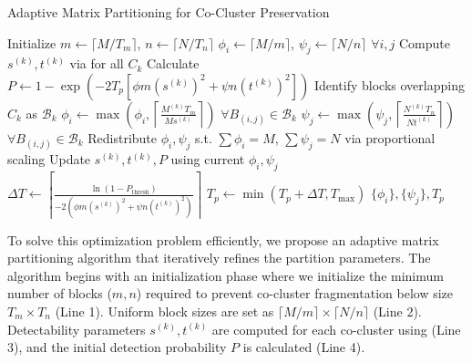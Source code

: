\documentclass[journal]{IEEEtran}
\begin{document}
\begin{algorithm}[!t]
    \caption{Adaptive Matrix Partitioning for Co-Cluster Preservation}
    \label{alg:partitioning}
    \begin{algorithmic}[1]
        \STATE Initialize $m \gets \lceil M / T_m \rceil$, $n \gets \lceil N / T_n \rceil$ 
        \STATE $\phi_i \gets \lceil M/m \rceil$, $\psi_j \gets \lceil N/n \rceil$ $\forall i,j$ 
        \STATE Compute $s^{(k)}, t^{(k)}$ via  for all $C_k$
        \STATE Calculate $P \gets 1 - \exp\left( -2 T_p \left[ \phi m (s^{(k)})^2 + \psi n (t^{(k)})^2 \right] \right)$
        \STATE Identify blocks overlapping $C_k$ as $\mathcal{B}_k$
        \STATE $\phi_i \gets \max\left( \phi_i, \left\lceil \frac{M^{(k)} T_m}{M s^{(k)}} \right\rceil \right)$ $\forall B_{(i,j)} \in \mathcal{B}_k$
        \STATE $\psi_j \gets \max\left( \psi_j, \left\lceil \frac{N^{(k)} T_n}{N t^{(k)}} \right\rceil \right)$ $\forall B_{(i,j)} \in \mathcal{B}_k$
        \ENDFOR
        \STATE Redistribute $\phi_i, \psi_j$ s.t. $\sum \phi_i = M$, $\sum \psi_j = N$ via proportional scaling
        \STATE Update $s^{(k)}, t^{(k)}, P$ using current $\phi_i, \psi_j$
        \STATE $\Delta T \gets \left\lceil \frac{\ln(1 - P_{\text{thresh}})}{-2 \left( \phi m (s^{(k)})^2 + \psi n (t^{(k)})^2 \right)} \right\rceil$
        \STATE $T_p \gets \min(T_p + \Delta T, T_{\text{max}})$
        \ENDIF
        \ENDWHILE
        \RETURN $\{\phi_i\}, \{\psi_j\}, T_p$
    \end{algorithmic}
\end{algorithm}

To solve this optimization problem efficiently, we propose an adaptive matrix partitioning algorithm that iteratively refines the partition parameters. The algorithm begins with an initialization phase where we initialize the minimum number of blocks ($m,n$) required to prevent co-cluster fragmentation below size $T_m \times T_n$ (Line 1). Uniform block sizes are set as $\lceil M/m \rceil \times \lceil N/n \rceil$ (Line 2). Detectability parameters $s^{(k)}, t^{(k)}$ are computed for each co-cluster using  (Line 3), and the initial detection probability $P$ is calculated (Line 4).
\end{document}
